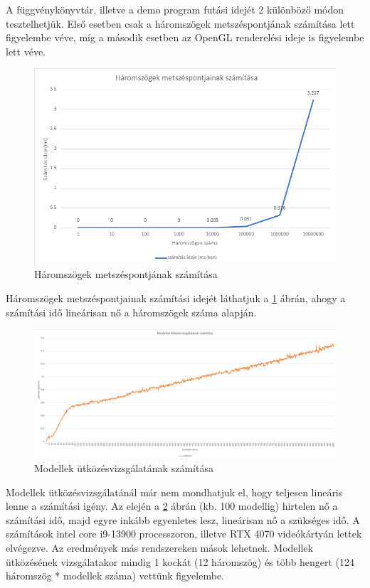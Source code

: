 A függvénykönyvtár, illetve a demo program futási idejét 2 különböző módon tesztelhetjük. Első esetben csak a háromszögek metszéspontjának számítása lett figyelembe véve, míg a második esetben az \cite{OpenGL}{OpenGL} renderelési ideje is figyelembe lett véve.

\begin{figure}[h]
	\centering
	\includegraphics[width=15truecm, height=9truecm]{images/háromszögek_száma.png}
	\caption{Háromszögek metszéspontjának számítása}
	\label{fig:szam_1}
\end{figure}

Háromszögek metszéspontjainak számítási idejét láthatjuk a \ref{fig:szam_1} ábrán, ahogy a számítási idő lineárisan nő a háromszögek száma alapján.

\newpage

\begin{figure}[h]
	\centering
	\includegraphics[width=15truecm, height=13truecm]{images/modellek_számítása.png}
	\caption{Modellek ütközésvizsgálatának számítása}
	\label{fig:szam_2}
\end{figure}

Modellek ütközésvizsgálatánál már nem mondhatjuk el, hogy teljesen lineáris lenne a számítási igény. Az elején a \ref{fig:szam_2} ábrán (kb. 100 modellig) hirtelen nő a számítási idő, majd egyre inkább egyenletes lesz, lineárisan nő a szükséges idő. A számítások intel core i9-13900 processzoron, illetve RTX 4070 videókártyán lettek elvégezve. Az eredmények más rendszereken mások lehetnek. Modellek ütközésének vizsgálatakor mindig 1 kockát (12 háromszög) és több hengert (124 háromszög * modellek száma) vettünk figyelembe.